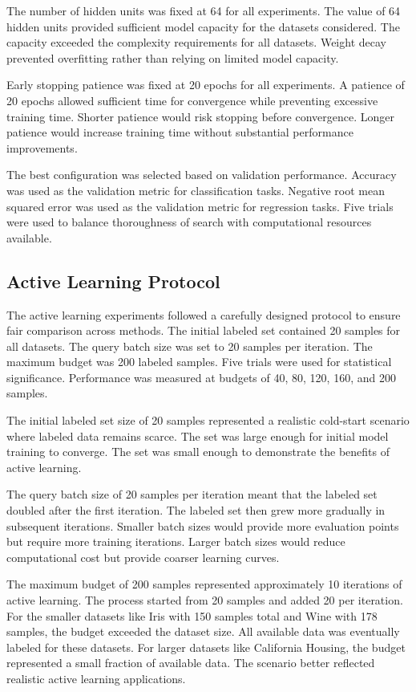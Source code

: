 \documentclass[conference]{IEEEtran}
\begin{document}
The number of hidden units was fixed at 64 for all experiments. The value of 64 hidden units provided sufficient model capacity for the datasets considered. The capacity exceeded the complexity requirements for all datasets. Weight decay prevented overfitting rather than relying on limited model capacity.

Early stopping patience was fixed at 20 epochs for all experiments. A patience of 20 epochs allowed sufficient time for convergence while preventing excessive training time. Shorter patience would risk stopping before convergence. Longer patience would increase training time without substantial performance improvements.

The best configuration was selected based on validation performance. Accuracy was used as the validation metric for classification tasks. Negative root mean squared error was used as the validation metric for regression tasks. Five trials were used to balance thoroughness of search with computational resources available.

\subsection{Active Learning Protocol}

The active learning experiments followed a carefully designed protocol to ensure fair comparison across methods. The initial labeled set contained 20 samples for all datasets. The query batch size was set to 20 samples per iteration. The maximum budget was 200 labeled samples. Five trials were used for statistical significance. Performance was measured at budgets of 40, 80, 120, 160, and 200 samples.

The initial labeled set size of 20 samples represented a realistic cold-start scenario where labeled data remains scarce. The set was large enough for initial model training to converge. The set was small enough to demonstrate the benefits of active learning.

The query batch size of 20 samples per iteration meant that the labeled set doubled after the first iteration. The labeled set then grew more gradually in subsequent iterations. Smaller batch sizes would provide more evaluation points but require more training iterations. Larger batch sizes would reduce computational cost but provide coarser learning curves.

The maximum budget of 200 samples represented approximately 10 iterations of active learning. The process started from 20 samples and added 20 per iteration. For the smaller datasets like Iris with 150 samples total and Wine with 178 samples, the budget exceeded the dataset size. All available data was eventually labeled for these datasets. For larger datasets like California Housing, the budget represented a small fraction of available data. The scenario better reflected realistic active learning applications.
\end{document}
